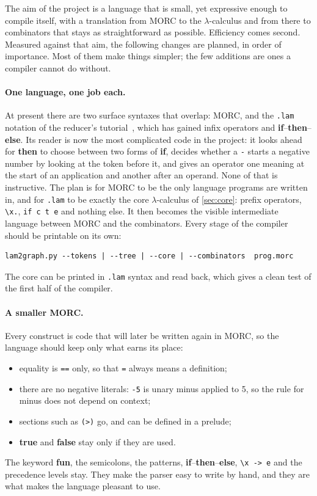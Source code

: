 \documentclass[11pt,a4paper]{article}
\theoremstyle{definition}
\theoremstyle{plain}
\newcommand{\kw}[1]{\textbf{#1}}
\begin{document}
The aim of the project is a language that is small, yet expressive enough to
compile itself, with a translation from MORC to the $\lambda$-calculus and
from there to combinators that stays as straightforward as possible.
Efficiency comes second. Measured against that aim, the following changes
are planned, in order of importance. Most of them make things simpler; the
few additions are ones a compiler cannot do without.

\paragraph{One language, one job each.} At present there are two surface
syntaxes that overlap: MORC, and the \texttt{.lam} notation of the reducer's
tutorial~\cite{graphtut}, which has gained infix operators and
\kw{if}--\kw{then}--\kw{else}. Its reader is now the most complicated code in
the project: it looks ahead for \kw{then} to choose between two forms of
\kw{if}, decides whether a \texttt{-} starts a negative number by looking at
the token before it, and gives an operator one meaning at the start of an
application and another after an operand. None of that is instructive. The
plan is for MORC to be the only language programs are written in, and for
\texttt{.lam} to be exactly the core $\lambda$-calculus of
\cref{sec:core}: prefix operators, \verb|\x.|, \verb|if c t e| and nothing
else. It then becomes the visible intermediate language between MORC and the
combinators. Every stage of the compiler should be printable on its own:
\begin{lstlisting}[style=plain]
lam2graph.py --tokens | --tree | --core | --combinators  prog.morc
\end{lstlisting}
The core can be printed in \texttt{.lam} syntax and read back, which gives
a clean test of the first half of the compiler.

\paragraph{A smaller MORC.} Every construct is code that will later be
written again in MORC, so the language should keep only what earns its place:
\begin{itemize}
\item equality is \texttt{==} only, so that \texttt{=} always means a
  definition;
\item there are no negative literals: \texttt{-5} is unary minus applied to
  5, so the rule for minus does not depend on context;
\item sections such as \texttt{(>)} go, and can be defined in a prelude;
\item \kw{true} and \kw{false} stay only if they are used.
\end{itemize}
The keyword \kw{fun}, the semicolons, the patterns, \kw{if}--\kw{then}--\kw{else},
\verb|\x -> e| and the precedence levels stay. They make the parser easy to
write by hand, and they are what makes the language pleasant to use.
\end{document}
